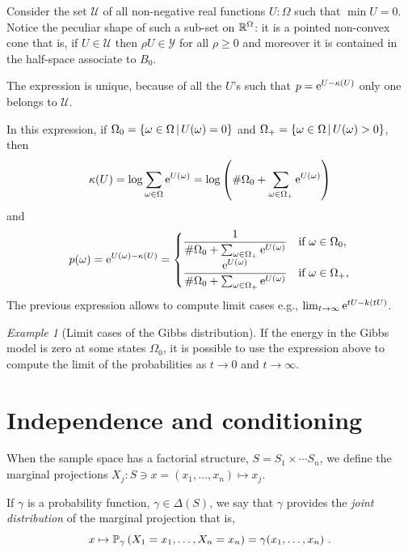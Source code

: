 \documentclass[12pt,a4paper]{amsart}
\theoremstyle{plain}%
\theoremstyle{definition}
\theoremstyle{remark}
\newtheorem{example}{Example}
\begin{document}
Consider the set $\mathcal U$ of all non-negative real functions $U : \Omega$ such that $\min U = 0$. Notice the peculiar shape of such a sub-set on $\mathbb{R}^\Omega$: it is a pointed non-convex cone that is, if $U \in \mathcal U$ then $\rho U \in \mathcal Y$ for all $\rho \geq 0$ and moreover it is contained in the half-space associate to $B_0$.

The expression is unique, because of all the $U$'s such that $p = \mathrm{e}^{U-\kappa(U)}$ only one belongs to $\mathcal U$.
  
In this expression, if $\Omega_0 = \left\{\omega \in \Omega \, \middle| \, U(\omega)=0 \right\}$ and $\Omega_+ = \left\{\omega \in \Omega \, \middle| \, U(\omega) > 0 \right\}$, then
  \begin{equation*}
 \kappa(U) = \log \sum_{\omega\in\Omega} \mathrm{e}^{U(\omega)} = \log\left(\# \Omega_0 + \sum_{\omega\in\Omega_+} \mathrm{e}^{U(\omega)}\right)  
  \end{equation*}
and
\begin{equation*}
    p(\omega) = \mathrm{e}^{U(\omega) - \kappa(U)} =
    \begin{cases}
      \dfrac1{\# \Omega_0 + \sum_{\omega\in\Omega_+} \mathrm{e}^{U(\omega)}} &\text{if $\omega \in \Omega_0$,} \\
      \dfrac{\mathrm{e}^{U(\omega)}}{ \# \Omega_0 + \sum_{\omega\in\Omega_+} \mathrm{e}^{U(\omega)}} &\text{if $\omega \in \Omega_+$,} \end{cases}
\end{equation*}
The previous expression allows to compute limit cases e.g., $\lim_{t \to \infty} \mathrm{e}^{tU - k(tU)}$.

\begin{example}[Limit cases of the Gibbs distribution]
If the energy in the Gibbs model is zero at some states $\Omega_0$, it is possible to use the expression above to compute the limit of the probabilities as $t \to 0$ and $t \to \infty$.  
\end{example}

\section{Independence and conditioning}
\label{sec:indep-cond}
When the sample space has a factorial structure,
$S=S_1 \times \cdots S_n$, we define the marginal projections
$X_j \colon S \ni x = (x_1,\dots,x_n) \mapsto x_j$.

If $\gamma$ is a probability function,
$\gamma \in \Delta(S)$, we say that $\gamma$
provides the \emph{joint distribution} of the marginal projection that is,
\begin{equation*}
  x \mapsto \operatorname{\mathbb P}_{\gamma}\left(X_1=x_1,\dots,X_n=x_n\right) = \gamma(x_1,\dots,x_n) \ .
\end{equation*}
\end{document}
